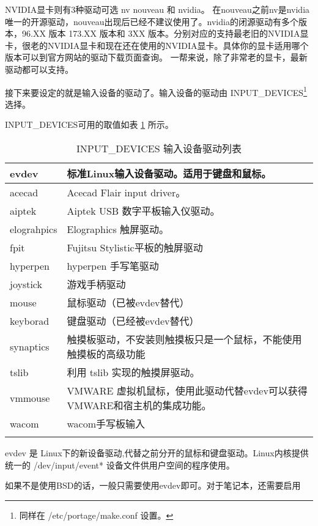 \documentclass[amstex,twoside]{ctexbook}
\begin{document}
NVIDIA显卡则有3种驱动可选 nv nouveau 和 nvidia。 在nouveau之前nv是nvidia唯一的开源驱动，nouveau出现后已经不建议使用了。nvidia的闭源驱动有多个版本，96.XX 版本 173.XX 版本和 3XX 版本。分别对应的支持最老旧的NVIDIA显卡，很老的NVIDIA显卡和现在还在使用的NVIDIA显卡。具体你的显卡适用哪个版本可以到官方网站的驱动下载页面查询。
一帮来说，除了非常老的显卡，最新驱动都可以支持。

接下来要设定的就是输入设备的驱动了。输入设备的驱动由 INPUT\_DEVICES\footnote{同样在 /etc/portage/make.conf 设置。} 选择。

INPUT\_DEVICES可用的取值如表 \ref{table:inputdevice} 所示。


\begin{longtable}{|l|p{}|}
\caption{INPUT\_DEVICES 输入设备驱动列表}\label{table:inputdevice}\\\hline
evdev & 标准Linux输入设备驱动。适用于键盘和鼠标。 \\\hline
acecad & Acecad Flair input driver。  \\\hline
aiptek & Aiptek  USB 数字平板输入仪驱动。 \\\hline
elograhpics & Elographics 触屏驱动。\\\hline
fpit & Fujitsu Stylistic平板的触屏驱动 \\\hline
hyperpen & hyperpen 手写笔驱动 \\\hline
joystick & 游戏手柄驱动 \\\hline
mouse & 鼠标驱动（已被evdev替代） \\\hline
keyborad & 键盘驱动（已经被evdev替代）\\\hline
synaptics & 触摸板驱动，不安装则触摸板只是一个鼠标，不能使用触摸板的高级功能 \\\hline
tslib & 利用 tslib 实现的触摸屏驱动。 \\\hline
vmmouse & VMWARE 虚拟机鼠标，使用此驱动代替evdev可以获得VMWARE和宿主机的集成功能。\\\hline
wacom & wacom手写板输入 \\\hline

\caption{INPUT\_DEVICES 输入设备驱动列表}
\end{longtable}


evdev 是 Linux下的新设备驱动,代替之前分开的鼠标和键盘驱动。Linux内核提供统一的 /dev/input/event* 设备文件供用户空间的程序使用。

如果不是使用BSD的话，一般只需要使用evdev即可。对于笔记本，还需要启用 
\end{document}
